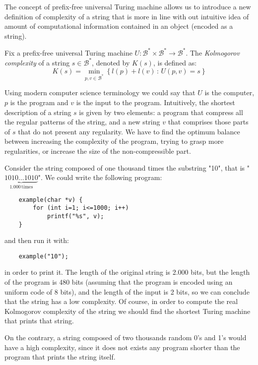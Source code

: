 The concept of prefix-free universal Turing machine allows us to introduce a new definition of complexity of a string that is more in line with out intuitive idea of amount of computational information contained in an object (encoded as a string).

\begin{definition}
\label{def:Kolmogorov-Complexity}
Fix a prefix-free universal Turing machine $U:\mathcal{B}^\ast \times \mathcal{B}^\ast \rightarrow \mathcal{B}^\ast$. The \emph{Kolmogorov complexity} of a string $s \in \mathcal{B}^\ast$, denoted by $K(s)$, is defined as:
\[
K(s)=\min_{p,v \in \mathcal{B}^\ast}\left\{l(p) + l(v)\,:\, U(p,v)=s\right\}
\]
\end{definition}

Using modern computer science terminology we could say that $U$ is the computer, $p$ is the program and $v$ is the input to the program. Intuitively, the shortest description of a string $s$ is given by two elements: a program that compress all the regular patterns of the string, and a new string $v$ that comprises those parts of $s$ that do not present any regularity. We have to find the optimum balance between increasing the complexity of the program, trying to grasp more regularities, or increase the size of the non-compressible part.

\begin{example}
Consider the string composed of one thousand times the substring "10", that is "$\underbrace{1010\ldots1010}_{1.000\,\mathrm{times}}$". We could write the following program:

\begin{verbatim}
    example(char *v) {
        for (int i=1; i<=1000; i++)
            printf("%s", v);
    }
\end{verbatim}
and then run it with:
\begin{verbatim}
    example("10");
\end{verbatim}

in order to print it. The length of the original string is 2.000 bits, but the length of the program is 480 bits (assuming that the program is encoded using an uniform code of 8 bits), and the length of the input is 2 bits, so we can conclude that the string has a low complexity. Of course, in order to compute the real Kolmogorov complexity of the string we should find the shortest Turing machine that prints that string.

On the contrary, a string composed of two thousands random 0's and 1's would have a high complexity, since it does not exists any program shorter than the program that prints the string itself.
\end{example}

